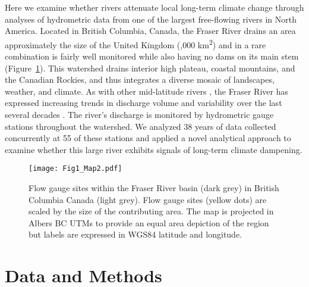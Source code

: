 \documentclass[linenumbers,draft]{AGUJournal}
\begin{document}
Here we examine whether rivers attenuate local long-term climate change through analyses of hydrometric data from one of the largest free-flowing rivers in North America. Located in British Columbia, Canada, the Fraser River drains an area approximately the size of the United Kingdom (,000 km\textsuperscript{2}) and in a rare combination is fairly well monitored while also having no dams on its main stem \citep{Vorosmarty:2010} (Figure~\ref{figone}). This watershed drains interior high plateau, coastal mountains, and the Canadian Rockies, and thus integrates a diverse mosaic of landscapes, weather, and climate. As with other mid-latitude rivers \citep{Bindoff:2013}, the Fraser River has expressed increasing trends in discharge volume and variability over the last several decades \citep{Dery:2012,Morrison:2002}. The river's discharge is monitored by hydrometric gauge stations throughout the watershed. We analyzed 38 years of data collected concurrently at 55 of these stations and applied a novel analytical approach to examine whether this large river exhibits signals of long-term climate dampening.

\begin{figure}[h]
	\centerline{\texttt{[image: Fig1\_Map2.pdf]}}
	\caption{Flow gauge sites within the Fraser River basin (dark grey) in British Columbia Canada (light grey). Flow gauge sites (yellow dots) are scaled by the size of the contributing area. The map is projected in Albers BC UTMs to provide an equal area depiction of the region but labels are expressed in WGS84 latitude and longitude.}
	\label{figone}
\end{figure}

\section{Data and Methods}
\end{document}
